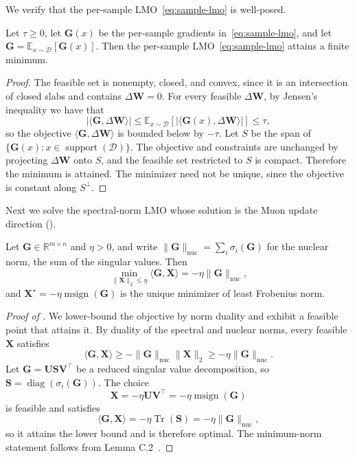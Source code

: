 \documentclass{article}
\DeclareMathOperator{\support}{support}
\newcommand{\mat}[1]{\bm{#1}}
\newcommand{\cD}{\mathcal{D}}
\newcommand{\EE}[2]{\mathbb{E}_{#1}\left[#2\right] }
\DeclareMathOperator{\diag}{diag}
\DeclareMathOperator{\Tr}{Tr}
\newcommand{\ip}[1]{\langle #1 \rangle}
\DeclareMathOperator{\msign}{msign}          %
\newcommand{\norm}[1]{\| #1\|}
\begin{document}
We verify that the per-sample LMO~\eqref{eq:sample-lmo} is well-posed.
\begin{proposition}
\label{prop:wellposed}
Let $\tau\ge 0$, let $\mat{G}(x)$ be the per-sample gradients in~\eqref{eq:sample-lmo}, and let $\mat{G}=\EE{x\sim\cD}{\mat{G}(x)}$. Then the per-sample LMO~\eqref{eq:sample-lmo} attains a finite minimum.
\end{proposition}
\begin{proof}
The feasible set is nonempty, closed, and convex, since it is an intersection of closed slabs and contains $\Delta\mat{W}=0$. For every feasible $\Delta\mat{W}$, by Jensen's inequality we have that 
\[
|\ip{\mat{G},\Delta\mat{W}}|
\le \EE{x\sim\cD}{|\ip{\mat{G}(x),\Delta\mat{W}}|}
\le\tau,
\]
so the objective $\ip{\mat{G},\Delta\mat{W}}$ is bounded below by $-\tau$. Let $S$ be the span of $\{\mat{G}(x):x\in\support(\cD)\}$. The objective and constraints are unchanged by projecting $\Delta\mat{W}$ onto $S$, and the feasible set restricted to $S$ is compact. Therefore the minimum is attained. The minimizer need not be unique, since the objective is constant along $S^\perp$.
\end{proof}

Next we solve the spectral-norm LMO whose solution is the Muon update direction ().
\begin{lemma}\label{lem:muon-lmo}
Let $\mat{G}\in\mathbb{R}^{m\times n}$ and $\eta>0$, and write
$\norm{\mat{G}}_{\mathrm{nuc}}=\sum_i\sigma_i(\mat{G})$ for the nuclear norm, the sum of the
singular values. Then
\[
    \min_{\norm{\mat{X}}_2\leq \eta}\ip{\mat{G},\mat{X}}
    =
    -\eta\norm{\mat{G}}_{\mathrm{nuc}},
\]
and $\mat{X}^\star = -\eta\msign(\mat{G})$ is the unique minimizer of least Frobenius norm.
\end{lemma}

\begin{proof}[Proof of ]
We lower-bound the objective by norm duality and exhibit a feasible point that
attains it. By duality of the spectral and nuclear norms, every feasible $\mat{X}$
satisfies
\[
    \ip{\mat{G},\mat{X}}
    \geq
    -\norm{\mat{G}}_{\mathrm{nuc}}\norm{\mat{X}}_2
    \geq
    -\eta\norm{\mat{G}}_{\mathrm{nuc}}.
\]
Let $\mat{G}=\mat{U}\mat{S} \mat{V}^\top$ be a reduced singular value decomposition, so
$\mat{S}=\diag(\sigma_i(\mat{G}))$. The choice
\[
    \mat{X}=-\eta \mat{U}\mat{V}^\top=-\eta\msign(\mat{G})
\]
is feasible and satisfies
\[
    \ip{\mat{G},\mat{X}}
    =
    -\eta\Tr(\mat{S})
    =
    -\eta\norm{\mat{G}}_{\mathrm{nuc}},
\]
so it attains the lower bound and is therefore optimal. The minimum-norm
statement follows from Lemma C.2~\cite{parshakova2026muon}.
\end{proof}
\end{document}
